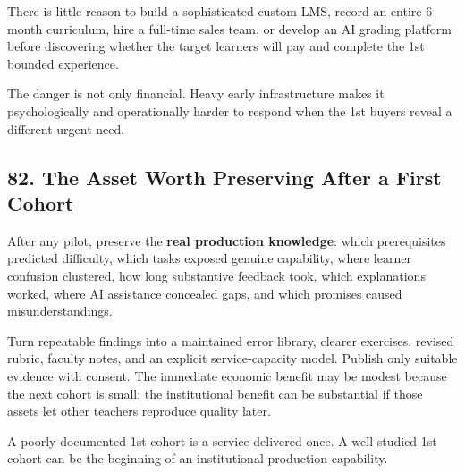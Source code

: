 There is little reason to build a sophisticated custom LMS, record an entire 6-month curriculum, hire a full-time sales team, or develop an AI grading platform before discovering whether the target learners will pay and complete the 1st bounded experience.

The danger is not only financial. Heavy early infrastructure makes it psychologically and operationally harder to respond when the 1st buyers reveal a different urgent need.

\subsection*{82. The Asset Worth Preserving After a First Cohort}

After any pilot, preserve the \textbf{real production knowledge}: which prerequisites predicted difficulty, which tasks exposed genuine capability, where learner confusion clustered, how long substantive feedback took, which explanations worked, where AI assistance concealed gaps, and which promises caused misunderstandings.

Turn repeatable findings into a maintained error library, clearer exercises, revised rubric, faculty notes, and an explicit service-capacity model. Publish only suitable evidence with consent. The immediate economic benefit may be modest because the next cohort is small; the institutional benefit can be substantial if those assets let other teachers reproduce quality later.

A poorly documented 1st cohort is a service delivered once. A well-studied 1st cohort can be the beginning of an institutional production capability.
